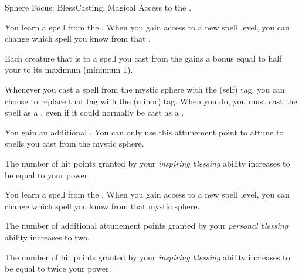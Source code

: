     \begin{feat}{Sphere Focus: Bless}{Casting, Magical}
        \featpre Access to the  .

         You learn a spell from the  .
        When you gain access to a new spell level, you can change which spell you know from that .

         Each creature that is  to a spell you cast from the   gains a bonus equal to half your  to its maximum  (minimum 1).

         Whenever you cast a spell from the  mystic sphere with the  (self) tag, you can choose to replace that tag with the  (minor) tag.
        When you do, you must cast the spell as a , even if it could normally be cast as a .

         You gain an additional .
        You can only use this attunement point to attune to spells you cast from the  mystic sphere.

         The number of hit points granted by your \textit{inspiring blessing} ability increases to be equal to your power.

         You learn a spell from the  .
        When you gain access to a new spell level, you can change which spell you know from that mystic sphere.

         The number of additional attunement points granted by your \textit{personal blessing} ability increases to two.

         The number of hit points granted by your \textit{inspiring blessing} ability increases to be equal to twice your power.
    \end{feat}

